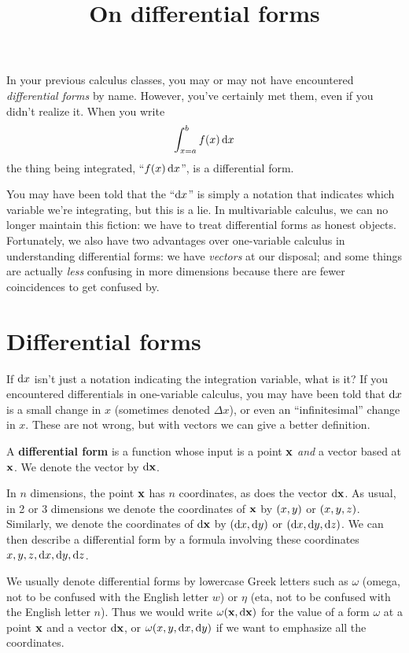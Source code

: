 \documentclass[12pt]{amsart}
\title{On differential forms}
\begin{document}
\maketitle

In your previous calculus classes, you may or may not have encountered \emph{differential forms} by name.
However, you've certainly met them, even if you didn't realize it.
When you write
\[ \int_{x=a}^b f(x) \,\mathrm{d} x \]
the thing being integrated, ``$f(x) \,\mathrm{d} x$'', is a differential form.

You may have been told that the ``$\mathrm{d} x$'' is simply a notation that indicates which variable we're integrating, but this is a lie.
In multivariable calculus, we can no longer maintain this fiction: we have to treat differential forms as honest objects.
Fortunately, we also have two advantages over one-variable calculus in understanding differential forms: we have \emph{vectors} at our disposal; and some things are actually \emph{less} confusing in more dimensions because there are fewer coincidences to get confused by.

\section{Differential forms}
\label{sec:differential-forms}

If $\mathrm{d} x$ isn't just a notation indicating the integration variable, what is it?
If you encountered differentials in one-variable calculus, you may have been told that $\mathrm{d} x$ is a small change in $x$ (sometimes denoted $\Delta x$), or even an ``infinitesimal'' change in $x$.
These are not wrong, but with vectors we can give a better definition.

\begin{defn}
  A \textbf{differential form} is a function whose input is a point $\mathbf{x}$ \emph{and} a vector based at $\mathbf{x}$.
  We denote the vector by $\mathrm{d} \mathbf{x}$.
\end{defn}

In $n$ dimensions, the point $\mathbf{x}$ has $n$ coordinates, as does the vector $\mathrm{d} \mathbf{x}$.
As usual, in 2 or 3 dimensions we denote the coordinates of $\mathbf{x}$ by $(x,y)$ or $(x,y,z)$.
Similarly, we denote the coordinates of $\mathrm{d} \mathbf{x}$ by $(\mathrm{d} x,\mathrm{d} y)$ or $(\mathrm{d} x,\mathrm{d} y,\mathrm{d} z)$.
We can then describe a differential form by a formula involving these coordinates $x,y,z,\mathrm{d} x,\mathrm{d} y,\mathrm{d} z$.

We usually denote differential forms by lowercase Greek letters such as $\omega$ (omega, not to be confused with the English letter $w$) or $\eta$ (eta, not to be confused with the English letter $n$).
Thus we would write $\omega(\mathbf{x},\mathrm{d} \mathbf{x})$ for the value of a form $\omega$ at a point $\mathbf{x}$ and a vector $\mathrm{d} \mathbf{x}$, or $\omega(x,y,\mathrm{d} x,\mathrm{d} y)$ if we want to emphasize all the coordinates.
\end{document}
